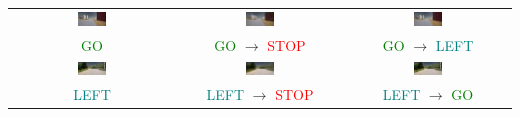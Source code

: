 \begin{table}[htbp]
\begin{tabular}{c|c|c}
\includegraphics[width=0.18\textwidth]{img/appendix/original_town7_005399.png} &
\includegraphics[width=0.18\textwidth]{img/appendix/latent_recon_town7_005399.png} &
\includegraphics[width=0.18\textwidth]{img/appendix/nun_recon_town7_005399.png} \\
\textcolor{green}{GO}  & 
\textcolor{green}{GO} $\rightarrow$ \textcolor{red}{STOP} & 
\textcolor{green}{GO} $\rightarrow$ \textcolor{teal}{LEFT} \\
\midrule

\includegraphics[width=0.18\textwidth]{img/appendix/original_town001.png} &
\includegraphics[width=0.18\textwidth]{img/appendix/recon_latent.png} &
\includegraphics[width=0.18\textwidth]{img/appendix/recon_nun.png} \\
\textcolor{teal}{LEFT}  & 
\textcolor{teal}{LEFT} $\rightarrow$ \textcolor{red}{STOP} & 
\textcolor{teal}{LEFT} $\rightarrow$ \textcolor{green}{GO} \\

\bottomrule

\end{tabular}
\end{table}




